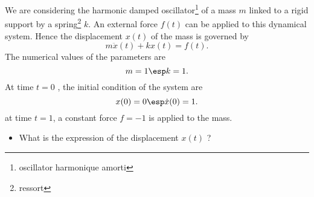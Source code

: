 \bexo
We are considering the harmonic damped oscillator\footnote{oscillator harmonique amorti} of a mass $m$ linked to a rigid support by a spring\footnote{ressort} $k$. An external force $f(t)$ can be applied to this dynamical system. Hence the displacement $x(t)$ of the mass is governed by
\begin{equation}
	m\ddot{x}(t)+kx(t)=f(t).
\end{equation}
The numerical values of the parameters are 
\begin{equation}
	m=1 \esp k=1.
\end{equation}
At time $t=0$ , the initial condition of the system are
\begin{equation}
	x(0)=0\esp \dot{x}(0)=1.
\end{equation}
at time $t=1$, a constant force $f=-1$ is applied to the mass. 

\begin{itemize}
	\item What is the expression of the displacement $x(t)$ ?
\end{itemize}






